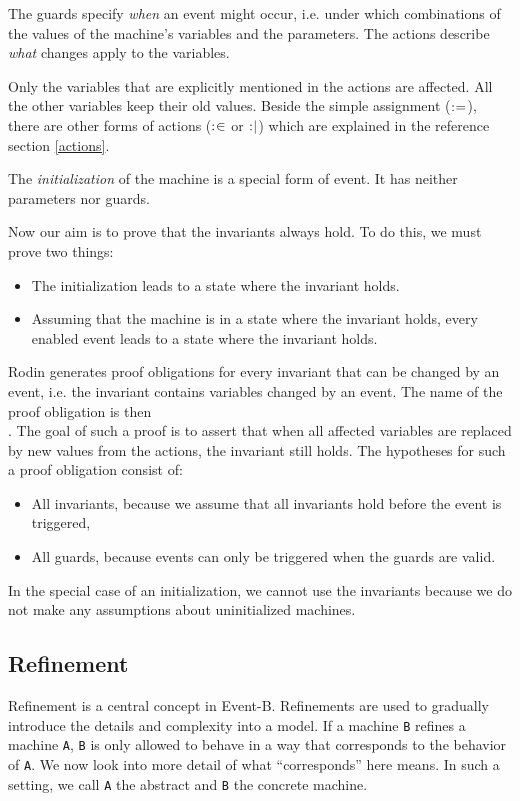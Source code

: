 The guards specify \emph{when} an event might occur, i.e. under which combinations
of the values of the machine's variables and the parameters.
The actions describe \emph{what} changes apply to the variables.

Only the variables that are explicitly mentioned in the actions are affected.
All the other variables keep their old values. Beside the simple assignment ($\mathrel{:\mkern1mu=}$),
there are other forms of actions ($\mathrel{:\mkern1mu\in}$ or $\mathrel{:\mkern1mu\mid}$) which are explained in
the reference section \ref{actions}.

The \emph{initialization} of the machine is a special form of event. It has neither parameters
nor guards.

Now our aim is to prove that the invariants always hold. To do this, we must prove two things:
\begin{itemize}
  \item The initialization leads to a state where the invariant holds.
  \item Assuming that the machine is in a state where the invariant holds,
    every enabled event leads to a state where the invariant holds.
\end{itemize}

Rodin generates proof obligations for every invariant that can be changed by an event, i.e. the invariant contains variables changed by an event.
The name of the proof obligation is then \\ .
The goal of such a proof is to assert that when all affected variables are replaced by new values from the actions, the invariant still holds. The hypotheses for such a proof obligation consist of:

\begin{itemize}

\item All invariants, because we assume that all invariants hold before the event is triggered,
\item All guards, because events can only be triggered when the guards are valid.
\end{itemize}

In the special case of an initialization, we cannot use the invariants because we do not
make any assumptions about uninitialized machines.

\subsection{Refinement}
\label{tut_refinement}
Refinement is a central concept in Event-B. Refinements are used to gradually
introduce the details and complexity into a model.
If a machine \texttt{B} refines a machine \texttt{A}, \texttt{B} is only allowed to behave in a way that
corresponds to the behavior of \texttt{A}. We now look into more detail of what ``corresponds''
here means.
In such a setting, we call \texttt{A} the abstract and \texttt{B} the concrete machine.


